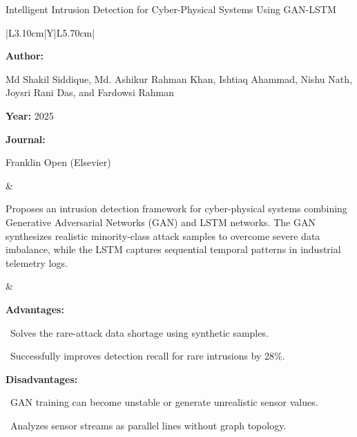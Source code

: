 \begin{frame}[t]{Intelligent Intrusion Detection for Cyber-Physical Systems Using GAN-LSTM}
\vspace{-0.30em}
{\footnotesize\setlength{\tabcolsep}{3.5pt}\renewcommand{\arraystretch}{1.10}
\begin{tabularx}{\textwidth}{|L{3.10cm}|Y|L{5.70cm}|}
\hline\lrhdr\hline
\begin{minipage}[t]{\linewidth}\fontsize{7.2pt}{9.2pt}\raggedright\selectfont
\textbf{Author:}\par
Md Shakil Siddique, Md. Ashikur Rahman Khan, Ishtiaq Ahammad, Nishu Nath, Joysri Rani Das, and Fardowsi Rahman\par\vspace{4pt}
\textbf{Year:} 2025\par\vspace{4pt}
\textbf{Journal:}\par
Franklin Open (Elsevier)\par\vspace{4pt}
\end{minipage}
&
\begin{minipage}[t]{\linewidth}\fontsize{7.2pt}{9.2pt}\raggedright\selectfont
Proposes an intrusion detection framework for cyber-physical systems combining Generative Adversarial Networks (GAN) and LSTM networks. The GAN synthesizes realistic minority-class attack samples to overcome severe data imbalance, while the LSTM captures sequential temporal patterns in industrial telemetry logs.\par\vspace{4pt}
\end{minipage}
&
\begin{minipage}[t]{\linewidth}\fontsize{7.2pt}{9.0pt}\raggedright\selectfont
\textcolor{strengthGreen}{\textbf{Advantages:}}\par\vspace{1.5pt}
\textbullet~Solves the rare-attack data shortage using synthetic samples.\par\vspace{2.0pt}\textbullet~Successfully improves detection recall for rare intrusions by 28\%.\par\vspace{4.0pt}
\textcolor{limitRed}{\textbf{Disadvantages:}}\par\vspace{1.5pt}
\textbullet~GAN training can become unstable or generate unrealistic sensor values.\par\vspace{2.0pt}\textbullet~Analyzes sensor streams as parallel lines without graph topology.\par\vspace{4pt}
\end{minipage} \\\hline
\end{tabularx}}
\end{frame}

